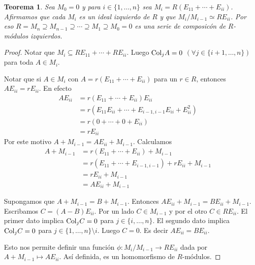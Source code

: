 \documentclass{report}
\newcommand{\Col}{\textnormal{Col}}
\newtheorem{theorem}{Teorema}
\begin{document}
  \begin{theorem}
    \label{theorem:compositionSeriesOfLeftModulesForMatrixRing}
    Sea \(M_0 = 0\) y para \(i \in \{1, \dots, n\}\) sea \(M_i = R (E_{1 1} + \cdots + E_{i i})\).
    Afirmamos que cada \(M_i\) es un ideal izquierdo de \(R\) y que \(M_i / M_{i - 1} \simeq R E_{i i}\).
    Por eso \(R = M_n \supseteq M_{n - 1} \supseteq \cdots \supseteq M_1 \supseteq M_0 = 0\) es una serie de composicón de \(R\)-módulos izquierdos.
  \end{theorem}
  \begin{proof}
    Notar que \(M_i \subseteq R E_{1 1} + \cdots + R E_{i i}\).
    Luego \(\Col_j A = 0\) \((\forall j \in \{i + 1, \dots, n\})\) para toda \(A \in M_i\).

    Notar que si \(A \in M_i\) con \(A = r (E_{1 1} + \cdots + E_{i i})\) para un \(r \in R\), entonces \(A E_{i i} = r E_{i i}\).
    En efecto
    \begin{align}
      A E_{i i}
      &=
      r (E_{11} + \cdots + E_{i i}) E_{i i}
      \\
      &=
      r (E_{11} E_{i i} + \cdots + E_{i - 1, i - 1} E_{i i} + E_{i i}^2)
      \\
      &=
      r (0 + \cdots + 0 + E_{i i})
      \\
      &=
      r E_{i i}
    \end{align}
    Por este motivo \(A + M_{i - 1} = A E_{i i} + M_{i - 1}\).
    Calculamos
    \begin{align}
      A + M_{i - 1}
      &=
      r (E_{1 1} + \cdots + E_{i i}) + M_{i - 1}
      \\
      &=
      r(E_{1 1} + \cdots + E_{i - 1, i - 1}) + r E_{i i} + M_{i - 1}
      \\
      &=
      r E_{i i} + M_{i - 1}
      \\
      &=
      A E_{i i} + M_{i - 1}
    \end{align}

    Supongamos que \(A + M_{i - 1} = B + M_{i - 1}\).
    Entonces \(A E_{i i} + M_{i - 1} = B E_{i i} + M_{i - 1}\).
    Escribamos \(C = (A - B) E_{i i}\).
    Por un lado \(C \in M_{i - 1}\) y por el otro \(C \in R E_{i i}\).
    El primer dato implica \(\Col_j C = 0\) para \(j \in \{i, \dots, n\}\).
    El segundo dato implica \(\Col_j C = 0\) para \(j \in \{1, \dots, n\} \setminus i\).
    Luego \(C = 0\).
    Es decir \(A E_{i i} = B E_{i i}\).

    Esto nos permite definir una función \(\phi : M_i / M_{i - 1} \rightarrow R E_{i i}\) dada por \(A + M_{i - 1} \mapsto A E_{i i}\).
    Así definida, es un homomorfismo de \(R\)-módulos.


\end{proof}
\end{document}
